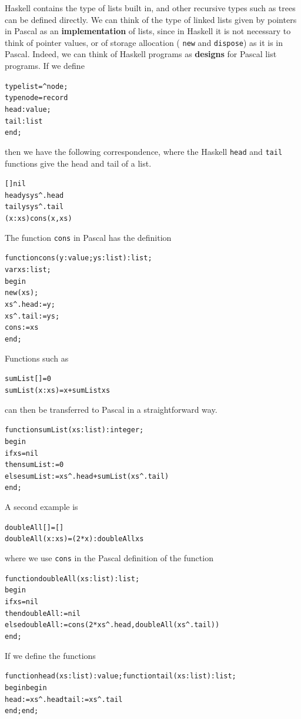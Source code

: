 Haskell contains the type of lists built in, and other recursive types such as
trees can be defined directly. We can think of the type of linked lists given
by pointers in Pascal as an \textbf{implementation} of lists, since in Haskell
it is not necessary to think of pointer values, or of storage allocation (
\texttt{new} and \texttt{dispose}) as it is in Pascal. Indeed, we can think of Haskell
programs as \textbf{designs} for Pascal list programs.
If we define
\begin{alltt}
type list = \^{}node;
type node = record
   head : value;
   tail : list
end;
\end{alltt}
then we have the following correspondence, where the Haskell \texttt{head} and
\texttt{tail} functions give the head and tail of a list.
\begin{alltt}
            []                        nil
            head ys                   ys\^{}.head 
            tail ys                   ys\^{}.tail 
            (x:xs)                    cons(x,xs) 
\end{alltt}
The function \texttt{cons} in Pascal has the definition
\begin{alltt}
function cons(y:value;ys:list):list;
  var xs:list;
  begin
    new(xs);
    xs\^{}.head := y;
    xs\^{}.tail := ys;
    cons := xs
  end;
\end{alltt}
Functions such as 
\begin{alltt}
sumList []     = 0 
sumList (x:xs) = x + sumList xs 
\end{alltt}
can then be transferred to Pascal in a
straightforward way.
\begin{alltt}
function sumList(xs:list):integer;
  begin
    if xs=nil 
      then sumList := 0
      else sumList := xs\^{}.head + sumList(xs\^{}.tail)
  end;
\end{alltt}
A second example is 
\begin{alltt}
doubleAll []     = []
doubleAll (x:xs) = (2*x) : doubleAll xs
\end{alltt}
where
we use \texttt{cons} in the Pascal definition of the function
\begin{alltt}
function doubleAll(xs:list):list;
  begin
    if xs=nil 
      then doubleAll := nil
      else doubleAll := cons( 2*xs\^{}.head , doubleAll(xs\^{}.tail) )
  end;
\end{alltt}
If we define the functions
\begin{alltt}
function head(xs:list):value;     function tail(xs:list):list;
  begin                            begin
    head := xs\^{}.head                 tail := xs\^{}.tail
  end;                             end;
\end{alltt}
